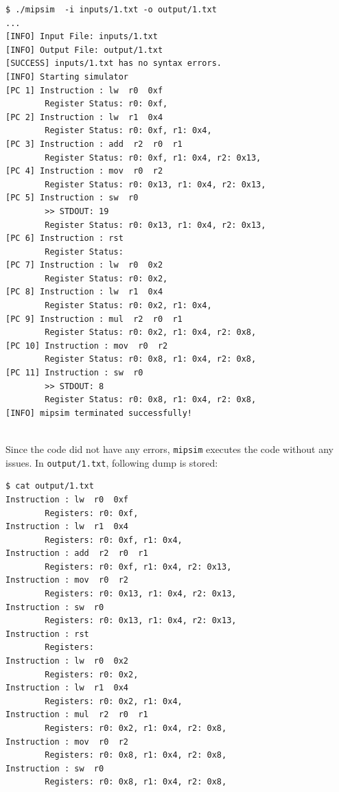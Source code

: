 \documentclass{homework}
\begin{document}
\begin{center}
\begin{code}
\begin{verbatim}
$ ./mipsim  -i inputs/1.txt -o output/1.txt
...
[INFO] Input File: inputs/1.txt
[INFO] Output File: output/1.txt
[SUCCESS] inputs/1.txt has no syntax errors.
[INFO] Starting simulator
[PC 1] Instruction : lw  r0  0xf
        Register Status: r0: 0xf,
[PC 2] Instruction : lw  r1  0x4
        Register Status: r0: 0xf, r1: 0x4,
[PC 3] Instruction : add  r2  r0  r1
        Register Status: r0: 0xf, r1: 0x4, r2: 0x13,
[PC 4] Instruction : mov  r0  r2
        Register Status: r0: 0x13, r1: 0x4, r2: 0x13,
[PC 5] Instruction : sw  r0
        >> STDOUT: 19
        Register Status: r0: 0x13, r1: 0x4, r2: 0x13,
[PC 6] Instruction : rst
        Register Status:
[PC 7] Instruction : lw  r0  0x2
        Register Status: r0: 0x2,
[PC 8] Instruction : lw  r1  0x4
        Register Status: r0: 0x2, r1: 0x4,
[PC 9] Instruction : mul  r2  r0  r1
        Register Status: r0: 0x2, r1: 0x4, r2: 0x8,
[PC 10] Instruction : mov  r0  r2
        Register Status: r0: 0x8, r1: 0x4, r2: 0x8,
[PC 11] Instruction : sw  r0
        >> STDOUT: 8
        Register Status: r0: 0x8, r1: 0x4, r2: 0x8,
[INFO] mipsim terminated successfully!
\end{verbatim}
\end{code}
\end{center}
\\
Since the code did not have any errors, \texttt{mipsim} executes the code without any issues. In \texttt{output/1.txt}, following dump is stored:
\\
\begin{center}
\begin{code}
\begin{verbatim}
$ cat output/1.txt
Instruction : lw  r0  0xf
        Registers: r0: 0xf,
Instruction : lw  r1  0x4
        Registers: r0: 0xf, r1: 0x4,
Instruction : add  r2  r0  r1
        Registers: r0: 0xf, r1: 0x4, r2: 0x13,
Instruction : mov  r0  r2
        Registers: r0: 0x13, r1: 0x4, r2: 0x13,
Instruction : sw  r0
        Registers: r0: 0x13, r1: 0x4, r2: 0x13,
Instruction : rst
        Registers:
Instruction : lw  r0  0x2
        Registers: r0: 0x2,
Instruction : lw  r1  0x4
        Registers: r0: 0x2, r1: 0x4,
Instruction : mul  r2  r0  r1
        Registers: r0: 0x2, r1: 0x4, r2: 0x8,
Instruction : mov  r0  r2
        Registers: r0: 0x8, r1: 0x4, r2: 0x8,
Instruction : sw  r0
        Registers: r0: 0x8, r1: 0x4, r2: 0x8,
\end{verbatim}
\end{code}
\end{center}
\end{document}
